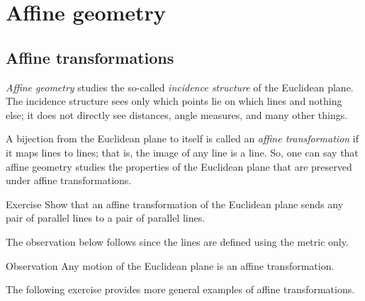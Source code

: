 
\chapter{Affine geometry}\label{chap:trans}

\section{Affine transformations}

\emph{Affine geometry} studies the so-called \emph{incidence structure} of the Euclidean plane.
The incidence structure sees only which points lie on which lines and nothing else;
it does not directly see distances, angle measures, and many other things.

A bijection from the Euclidean plane to itself is called an \emph{affine transformation} if it maps lines to lines;
that is, the image of any line is a line.
So, one can say that affine geometry studies the properties of the Euclidean plane that are preserved under affine transformations.

\begin{thm}{Exercise}\label{ex:affine-par}
Show that an affine transformation of the Euclidean plane sends any pair of parallel lines to a pair of parallel lines.
\end{thm}

The observation below follows since the lines are defined using the metric only.

\begin{thm}{Observation}
Any motion of the Euclidean plane is an affine transformation.
\end{thm}

The following exercise provides more general examples of affine transformations.

